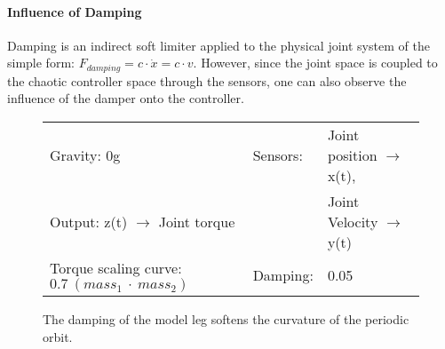 \documentclass[main]{subfiles}
\begin{document}
\paragraph{Influence of Damping} Damping is an indirect soft limiter applied to the physical joint system of the simple form: \(F_{damping} = c \cdot \dot{x} = c \cdot v\). %
%
However, since the joint space is coupled to the chaotic controller space through the sensors, one can also observe the influence of the damper onto the controller.

\begin{figure}[H]
	\centering
	\begin{minipage}{1.3\textwidth}
	\hspace*{-5em}
	\end{minipage}
	\caption[Damped, limited chaotic controller controlling model leg]{The damping of the model leg softens the curvature of the periodic orbit.}
	\begin{tabular}{l|ll}
	\hline 
	Gravity: 0g  & Sensors: & Joint position \(\rightarrow\) x(t),\\
	 Output: z(t) \(\rightarrow\) Joint torque & & Joint Velocity \(\rightarrow\) y(t) \\
	  Torque scaling curve: \(0.7~(mass_1~\cdot~mass_2)\) & Damping: & 0.05 \\
	  \hline
	\end{tabular}

	\label{figure:limited-damped-model-leg-damping1}
\end{figure}
\end{document}
